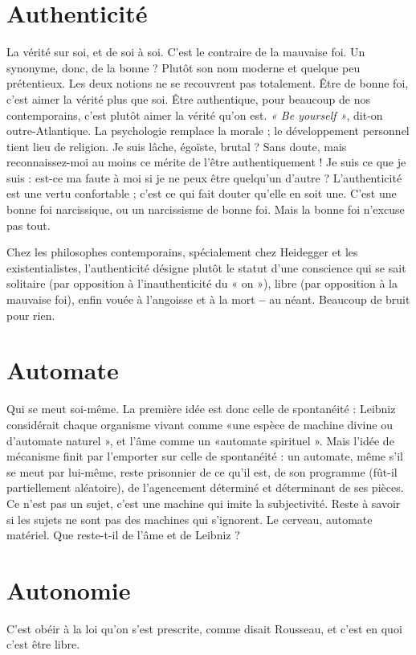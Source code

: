 \section{Authenticité}
La vérité sur soi, et de soi à soi. C’est le contraire de la
mauvaise foi. Un synonyme, donc, de la bonne ? Plutôt
son nom moderne et quelque peu prétentieux. Les deux notions ne se recouvrent
pas totalement. Être de bonne foi, c’est aimer la vérité plus que soi. Être
authentique, pour beaucoup de nos contemporains, c’est plutôt aimer la vérité
qu’on est. {\it « Be yourself »}, dit-on outre-Atlantique. La psychologie remplace la
morale ; le développement personnel tient lieu de religion. Je suis lâche,
égoïste, brutal ? Sans doute, mais reconnaissez-moi au moins ce mérite de l’être
authentiquement ! Je suis ce que je suis : est-ce ma faute à moi si je ne peux être
quelqu'un d’autre ? L’authenticité est une vertu confortable ; c’est ce qui fait
douter qu’elle en soit une. C’est une bonne foi narcissique, ou un narcissisme
de bonne foi. Mais la bonne foi n’excuse pas tout.

Chez les philosophes contemporains, spécialement chez Heidegger et les
existentialistes, l’authenticité désigne plutôt le statut d’une conscience qui se
sait solitaire (par opposition à l’inauthenticité du « on »), libre (par opposition
à la mauvaise foi), enfin vouée à l’angoisse et à la mort {\bf --} au néant. Beaucoup
de bruit pour rien.

\section{Automate}
Qui se meut soi-même. La première idée est donc celle de spontanéité :
Leibniz considérait chaque organisme vivant comme
«une espèce de machine divine ou d’automate naturel », et l’âme comme un
«automate spirituel ». Mais l’idée de mécanisme finit par l'emporter sur celle
de spontanéité : un automate, même s’il se meut par lui-même, reste prisonnier
de ce qu’il est, de son programme (fût-il partiellement aléatoire), de l’agencement
déterminé et déterminant de ses pièces. Ce n’est pas un sujet, c’est une
machine qui imite la subjectivité. Reste à savoir si les sujets ne sont pas des
machines qui s’ignorent. Le cerveau, automate matériel. Que reste-t-il de l'âme
et de Leibniz ?

\section{Autonomie}
C'est obéir à la loi qu’on s’est prescrite, comme disait Rousseau,
et c’est en quoi c’est être libre.

